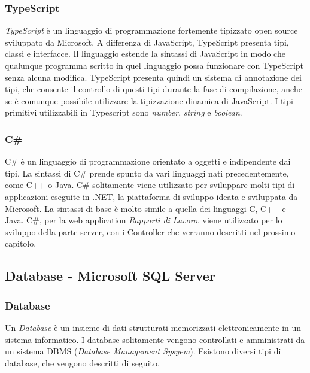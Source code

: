   \subsubsection{TypeScript}
  \textit{TypeScript} è un linguaggio di programmazione fortemente tipizzato open source sviluppato da Microsoft. A differenza
  di JavaScript, TypeScript presenta tipi, classi e interfacce. Il linguaggio estende la sintassi di JavaScript in modo che
  qualunque programma scritto in quel linguaggio possa funzionare con TypeScript senza alcuna modifica. TypeScript presenta quindi
  un sistema di annotazione dei tipi, che consente il controllo di questi tipi durante la fase di compilazione, anche se è comunque
  possibile utilizzare la tipizzazione dinamica di JavaScript. I tipi primitivi utilizzabili in Typescript sono \textit{number},
  \textit{string} e \textit{boolean}.

  \subsubsection{C\#}
  C\# è un linguaggio di programmazione orientato a oggetti e indipendente dai tipi. La sintassi di C\# prende spunto da
  vari linguaggi nati precedentemente, come C++ o Java.  C\# solitamente viene utilizzato per sviluppare molti tipi di applicazioni
  eseguite in .NET, la piattaforma di sviluppo ideata e sviluppata da Microsoft. La sintassi di base è molto simile
  a quella dei linguaggi C, C++ e Java.  
  C\#, per la web application \textit{Rapporti di Lavoro}, viene utilizzato per lo sviluppo della parte server, con i 
  Controller che verranno descritti nel prossimo capitolo.

  \subsection{Database - Microsoft SQL Server}
  \subsubsection{Database}
  Un \textit{Database} è un insieme di dati strutturati memorizzati elettronicamente in un sistema informatico.
  I database solitamente vengono controllati e amministrati da un sistema DBMS (\textit{Database Management Sysyem}). 
  Esistono diversi tipi di database, che vengono descritti di seguito.
